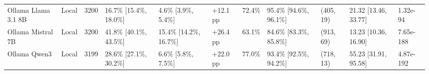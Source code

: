 \begin{table}[t]
\begin{tabular}{llrllllllll}
Ollama Llama 3.1 8B & Local & 3200 & 16.7\% [15.4\%, 18.0\%] & 4.6\% [3.9\%, 5.4\%] & +12.1 pp & 72.4\% & 95.4\% [94.6\%, 96.1\%] & (405, 19) & 21.32 [13.46, 33.77] & 1.32e-94 \\
Ollama Mistral 7B & Local & 3200 & 41.8\% [40.1\%, 43.5\%] & 15.4\% [14.2\%, 16.7\%] & +26.4 pp & 63.1\% & 84.6\% [83.3\%, 85.8\%] & (913, 69) & 13.23 [10.36, 16.90] & 7.65e-188 \\
Ollama Qwen3 & Local & 3199 & 28.6\% [27.1\%, 30.2\%] & 6.6\% [5.8\%, 7.5\%] & +22.0 pp & 77.0\% & 93.4\% [92.5\%, 94.2\%] & (718, 13) & 55.23 [31.91, 95.58] & 4.87e-192 \\
\bottomrule
\end{tabular}

\end{table}


